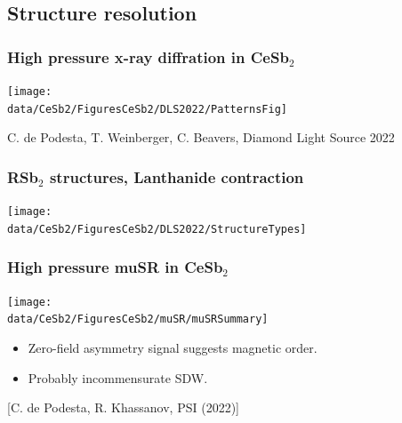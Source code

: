 \subsection{Structure resolution}

\begin{frame}[label=CeSb2xray-0]
\frametitle{High pressure x-ray diffration in CeSb$_2$}
\centerline{\texttt{[image: \\data/CeSb2/FiguresCeSb2/DLS2022/PatternsFig]}}

\vspace{0em}
\centerline{\makebox[\linewidth]{\rule{0.85\textwidth}{0.4pt}}}
\centerline{\scriptsize C. de Podesta, T. Weinberger, C. Beavers, Diamond Light Source 2022}


\end{frame}


\begin{frame}[label=CeSb2xray-1]
\frametitle{RSb$_2$ structures, Lanthanide contraction}
\centerline{\texttt{[image: \\data/CeSb2/FiguresCeSb2/DLS2022/StructureTypes]}}

\end{frame}


\begin{frame}[label=CeSb2muSR]
    \frametitle{High pressure muSR in CeSb$_2$}
    \vspace{0em}
    \centerline{\texttt{[image: \\data/CeSb2/FiguresCeSb2/muSR/muSRSummary]}}
    
    \begin{itemize}
    \item Zero-field asymmetry signal suggests magnetic order.
    \item Probably incommensurate SDW.
    \end{itemize}
    
    
    \vspace{0em}
    \centerline{\makebox[\linewidth]{\rule{0.85\textwidth}{0.4pt}}}
    
    \centerline{\scriptsize [C. de Podesta, R. Khassanov, PSI (2022)]}
    
\end{frame}

